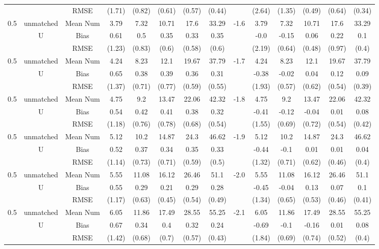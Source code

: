 \begin{tabular}{@{\extracolsep{5pt}}lc|cccccc|lccccc}
 &  & RMSE & (1.71) & (0.82) & (0.61) & (0.57) & (0.44) &  & (2.64) & (1.35) & (0.49) & (0.64) & (0.34) \\
0.5 & unmatched & Mean Num & 3.79 & 7.32 & 10.71 & 17.6 & 33.29 & -1.6 & 3.79 & 7.32 & 10.71 & 17.6 & 33.29 \\
 & U & Bias & 0.61 & 0.5 & 0.35 & 0.33 & 0.35 &  & -0.0 & -0.15 & 0.06 & 0.22 & 0.1 \\
 &  & RMSE & (1.23) & (0.83) & (0.6) & (0.58) & (0.6) &  & (2.19) & (0.64) & (0.48) & (0.97) & (0.4) \\
0.5 & unmatched & Mean Num & 4.24 & 8.23 & 12.1 & 19.67 & 37.79 & -1.7 & 4.24 & 8.23 & 12.1 & 19.67 & 37.79 \\
 & U & Bias & 0.65 & 0.38 & 0.39 & 0.36 & 0.31 &  & -0.38 & -0.02 & 0.04 & 0.12 & 0.09 \\
 &  & RMSE & (1.37) & (0.71) & (0.77) & (0.59) & (0.55) &  & (1.93) & (0.57) & (0.62) & (0.54) & (0.39) \\
0.5 & unmatched & Mean Num & 4.75 & 9.2 & 13.47 & 22.06 & 42.32 & -1.8 & 4.75 & 9.2 & 13.47 & 22.06 & 42.32 \\
 & U & Bias & 0.54 & 0.42 & 0.41 & 0.38 & 0.32 &  & -0.41 & -0.12 & -0.04 & 0.01 & 0.08 \\
 &  & RMSE & (1.18) & (0.76) & (0.78) & (0.68) & (0.54) &  & (1.55) & (0.69) & (0.72) & (0.54) & (0.42) \\
0.5 & unmatched & Mean Num & 5.12 & 10.2 & 14.87 & 24.3 & 46.62 & -1.9 & 5.12 & 10.2 & 14.87 & 24.3 & 46.62 \\
 & U & Bias & 0.52 & 0.37 & 0.34 & 0.35 & 0.33 &  & -0.44 & -0.1 & 0.01 & 0.01 & 0.04 \\
 &  & RMSE & (1.14) & (0.73) & (0.71) & (0.59) & (0.5) &  & (1.32) & (0.71) & (0.62) & (0.46) & (0.4) \\
0.5 & unmatched & Mean Num & 5.55 & 11.08 & 16.12 & 26.46 & 51.1 & -2.0 & 5.55 & 11.08 & 16.12 & 26.46 & 51.1 \\
 & U & Bias & 0.55 & 0.29 & 0.21 & 0.29 & 0.28 &  & -0.45 & -0.04 & 0.13 & 0.07 & 0.1 \\
 &  & RMSE & (1.17) & (0.63) & (0.45) & (0.54) & (0.49) &  & (1.34) & (0.65) & (0.53) & (0.46) & (0.41) \\
0.5 & unmatched & Mean Num & 6.05 & 11.86 & 17.49 & 28.55 & 55.25 & -2.1 & 6.05 & 11.86 & 17.49 & 28.55 & 55.25 \\
 & U & Bias & 0.67 & 0.34 & 0.4 & 0.32 & 0.24 &  & -0.69 & -0.1 & -0.16 & 0.01 & 0.08 \\
 &  & RMSE & (1.42) & (0.68) & (0.7) & (0.57) & (0.43) &  & (1.84) & (0.69) & (0.74) & (0.52) & (0.4) \\

\end{tabular}
